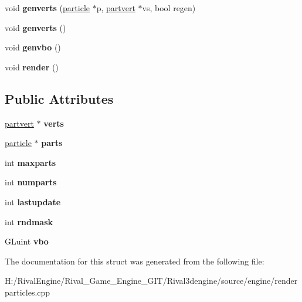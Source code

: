 \begin{DoxyCompactItemize}
void {\bfseries genverts} (\hyperlink{structparticle}{particle} $\ast$p, \hyperlink{structpartvert}{partvert} $\ast$vs, bool regen)
\item 
\mbox{\label{structvarenderer_a71e52136cd0dc6897fb81eb0e2095c73}} 
void {\bfseries genverts} ()
\item 
\mbox{\label{structvarenderer_ac5b8f5976f75693b969ef751b9c8c4f7}} 
void {\bfseries genvbo} ()
\item 
\mbox{\label{structvarenderer_a63b27c69dd184ad3c7a00e009df17b9a}} 
void {\bfseries render} ()
\end{DoxyCompactItemize}
\subsection*{Public Attributes}
\begin{DoxyCompactItemize}
\item 
\mbox{\label{structvarenderer_ae67c02d9eafe30647b02ffe9d3c8e4f2}} 
\hyperlink{structpartvert}{partvert} $\ast$ {\bfseries verts}
\item 
\mbox{\label{structvarenderer_a64b0ea15189661fce0a2cf9ae52e5239}} 
\hyperlink{structparticle}{particle} $\ast$ {\bfseries parts}
\item 
\mbox{\label{structvarenderer_ae6a14ced86d1208b8651a71b9f1611fe}} 
int {\bfseries maxparts}
\item 
\mbox{\label{structvarenderer_a174b7a7aeb2b1943223f442aa5be8dad}} 
int {\bfseries numparts}
\item 
\mbox{\label{structvarenderer_a59561467d9d586f2c8e684bee04d32e7}} 
int {\bfseries lastupdate}
\item 
\mbox{\label{structvarenderer_a5270bb98c179350272b82e2fd295b938}} 
int {\bfseries rndmask}
\item 
\mbox{\label{structvarenderer_a83bf08bc37b71c3641882ea6a905e357}} 
G\+Luint {\bfseries vbo}
\end{DoxyCompactItemize}


The documentation for this struct was generated from the following file\+:\begin{DoxyCompactItemize}
\item 
H\+:/\+Rival\+Engine/\+Rival\+\_\+\+Game\+\_\+\+Engine\+\_\+\+G\+I\+T/\+Rival3dengine/source/engine/renderparticles.\+cpp\end{DoxyCompactItemize}
